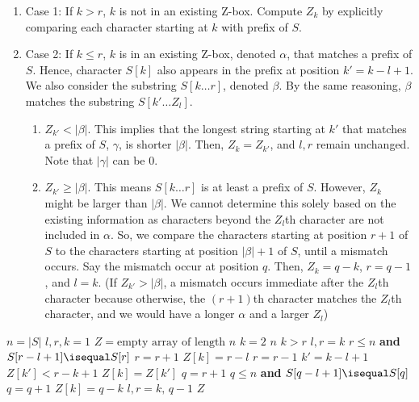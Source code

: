\begin{enumerate}
    \item Case 1: If $k > r$, $k$ is not in an existing Z-box. Compute $Z_k$ by explicitly comparing each character starting at $k$ with prefix of $S$.
    \item Case 2: If $k \leq r$, $k$ is in an existing Z-box, denoted $\alpha$, that matches a prefix of $S$. Hence, character $S[k]$ also appears in the prefix at position $k' = k - l + 1$. \\ We also consider the substring $S[k\ldots r]$, denoted $\beta$. By the same reasoning, $\beta$ matches the substring $S[k'\ldots Z_l]$.
    \begin{enumerate}
        \item $Z_{k'} < |\beta|$. This implies that the longest string starting at $k'$ that matches a prefix of $S$, $\gamma$, is shorter $|\beta|$. Then, $Z_{k} = Z_{k'}$, and $l,r$ remain unchanged. Note that $|\gamma|$ can be 0.
        \item $Z_{k'} \geq |\beta|$. This means $S[k\ldots r]$ is at least a prefix of $S$. However, $Z_k$ might be larger than $|\beta|$. We cannot determine this solely based on the existing information as characters beyond the $Z_l$th character are not included in $\alpha$. So, we compare the characters starting at position $r+1$ of $S$ to the characters starting at position $|\beta|+1$ of $S$, until a mismatch occurs. Say the mismatch occur at position $q$. Then, $Z_k = q- k$, $r = q-1$, and $l = k$. (If $Z_{k'} > |\beta|$, a mismatch occurs immediate after the $Z_{l}$th character because otherwise, the $(r+1)$th character matches the $Z_{l}$th character, and we would have a longer $\alpha$ and a larger $Z_l$)
    \end{enumerate}
\end{enumerate}

\begin{codebox}
    \li $n = |S|$
    \li $l,r,k = 1$
    \li $Z = \text{empty array of length $n$}$
    \li \For $k=2$ \To $n$ \Do
        \li \If $k > r$ \Then {}
            \li {}
            \li $l,r = k$ 
            \li \While $r \leq n$ \textbf{and} $S[r-l+1] \isequal S[r]$ \Do
                \li $r = r + 1$
            \End
            \li $Z[k] = r-l$
            \li $r = r - 1$
        \li \Else {}
            \li $k' = k - l + 1$
            \li \If $Z[k'] < r - k + 1$ \Then {}
                \li $Z[k] = Z[k']$ 
            \li \Else {}
                \li $q = r+1$
                \li \While $q \leq n$ \textbf{and} $S[q-l + 1] \isequal S[q]$ \Do
                    \li $q = q + 1$
                \End
                \li $Z[k] = q-k$
                \li $l,r = k, \,q-1$ 
            \End
        \End
        \End
        \li \Return $Z$ 
\end{codebox}

